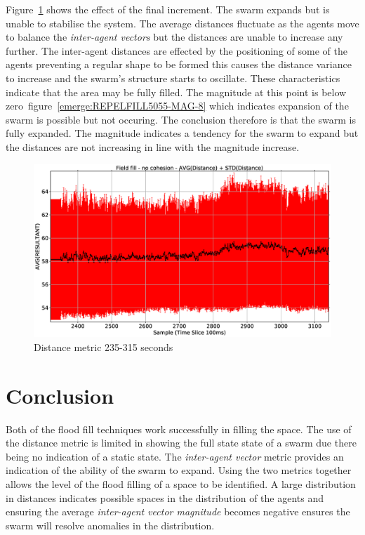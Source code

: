 Figure~\ref{emerge:REPELFILL5055-DIST-8} shows the effect of the final increment. The swarm expands but is unable to stabilise the system. The average distances fluctuate as the agents move to balance the \textit{inter-agent vectors} but the distances are unable to increase any further. The inter-agent distances are effected by the positioning of some of the agents preventing a regular shape to be formed this causes the distance variance to increase and the swarm's structure starts to oscillate. These characteristics indicate that the area may be fully filled. The magnitude at this point is below zero~figure~\ref{emerge:REPELFILL5055-MAG-8} which indicates expansion of the swarm is possible but not occuring. The conclusion therefore is that the swarm is fully expanded. The magnitude indicates a tendency for the swarm to expand but the distances are not increasing in line with the magnitude increase. 

\begin{figure}[H]
\begin{center}
\includegraphics[width=12cm]{CHAPTER-8/figures/REPELFILL5055-DIST-8}
\end{center}
\caption{Distance metric 235-315 seconds\label{emerge:REPELFILL5055-DIST-8}}
\end{figure}

\section{Conclusion}
Both of the flood fill techniques work successfully in filling the space. The use of the distance metric is limited in showing the full state state of a swarm due there being no indication of a static state. The \textit{inter-agent vector} metric provides an indication of the ability of the swarm to expand. Using the two metrics together allows the level of the flood filling of a space to be identified. A large distribution in distances indicates possible spaces in the distribution of the agents and ensuring the average \textit{inter-agent vector magnitude} becomes negative ensures the swarm will resolve anomalies in the distribution.

